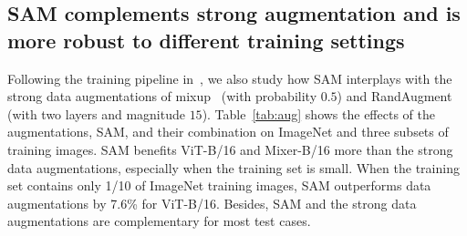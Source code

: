 \documentclass{article}
\begin{document}




\subsection{SAM complements strong augmentation and is more robust to different training settings}
\label{sec:aug}

Following the training pipeline in~\cite{tolstikhin2021mlpmixer}, we also study how SAM interplays with the strong data augmentations of 
mixup~\cite{zhang2018mixup} (with probability $0.5$) and RandAugment~\cite{cubuk2019randaugment} (with two layers and magnitude $15$). 
Table~\ref{tab:aug} shows the effects of the augmentations, SAM, and their combination on  ImageNet and three subsets of training images. %
SAM benefits ViT-B/16 and Mixer-B/16 more than the strong data augmentations, especially when the training set is small. When the training set contains only 1/10 of ImageNet training images, SAM outperforms data augmentations by 7.6\% for ViT-B/16. Besides, SAM and the strong data augmentations are complementary for most test cases. %
\end{document}
